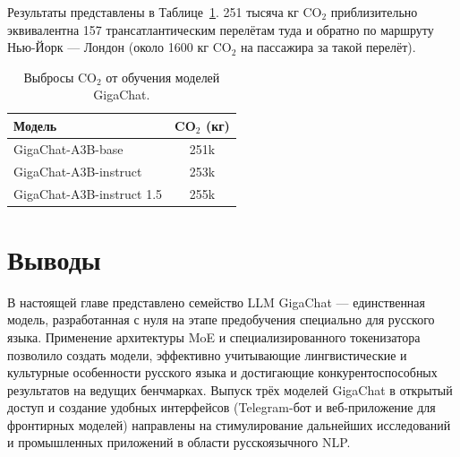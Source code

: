 Результаты представлены в Таблице~\ref{tab:gc_co2}. 251 тысяча кг CO$_2$ приблизительно эквивалентна 157 трансатлантическим перелётам туда и обратно по маршруту Нью-Йорк --- Лондон (около 1600 кг CO$_2$ на пассажира за такой перелёт).

\begin{table}[H]
    \centering
    \caption{Выбросы CO$_2$ от обучения моделей GigaChat.}
    \label{tab:gc_co2}
    \small
    \begin{tabular}{lc}
        \toprule
        \textbf{Модель} & \textbf{CO$_2$ (кг)} \\
        \midrule
        GigaChat-A3B-base         & 251k \\
        GigaChat-A3B-instruct     & 253k \\
        GigaChat-A3B-instruct 1.5 & 255k \\
        \bottomrule
    \end{tabular}
\end{table}

\section{Выводы}\label{sec:gc_conclusions}

В настоящей главе представлено семейство LLM GigaChat --- единственная модель, разработанная с нуля на этапе предобучения специально для русского языка. Применение архитектуры MoE и специализированного токенизатора позволило создать модели, эффективно учитывающие лингвистические и культурные особенности русского языка и достигающие конкурентоспособных результатов на ведущих бенчмарках. Выпуск трёх моделей GigaChat в открытый доступ и создание удобных интерфейсов (Telegram-бот и веб-приложение для фронтирных моделей) направлены на стимулирование дальнейших исследований и промышленных приложений в области русскоязычного NLP.
